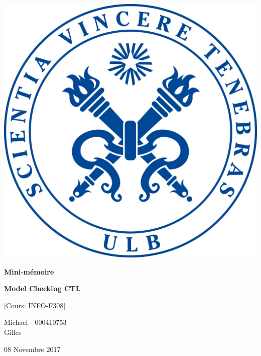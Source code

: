 \documentclass[11pt,a4paper]{article}
\begin{document}
\begin{titlepage}
\begin{center}
\includegraphics[scale=0.15]{ulb.jpg}

\vspace{1cm}

\par{\huge \textbf{Mini-mémoire}}\bigbreak
\par{\huge \textbf{Model Checking CTL}}
\vspace{1cm}
\par{\large [Cours: INFO-F308]}
\vspace{1cm}

\par \hrulefill \par
\vspace{1cm}
 Michael - 000410753\\
 Gilles
\vspace{0.7cm}
\par \hrulefill \par

\vspace{1cm}
\par 08 Novembre 2017

\end{center}
\end{titlepage}
\newpage
\tableofcontents
\newpage
\end{document}
